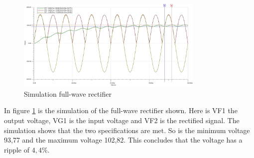 \begin{figure}[!htb]
    \centering
    \includegraphics[width=0.8\textwidth]{figuren/Simulation_FWR.jpg}
    \caption{Simulation full-wave rectifier}
    \label{fig:Simulation_FWR}
\end{figure}

In figure \ref{fig:Simulation_FWR} is the simulation of the full-wave rectifier shown. Here is VF1 the output voltage, VG1 is the input voltage and VF2 is the rectified signal. The simulation shows that the two specifications are met. So is the minimum voltage 93,77 and the maximum voltage 102,82. This concludes that the voltage has a ripple of $4,4\%$.